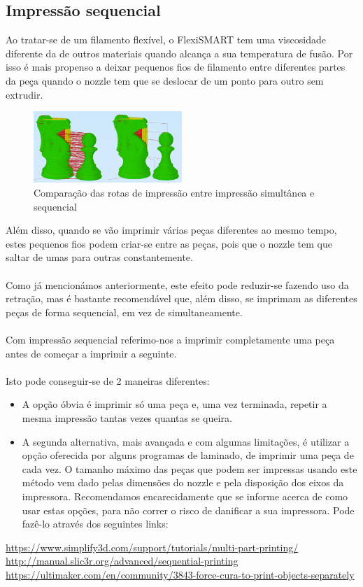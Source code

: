 \documentclass[11pt,a4paper]{article}
\begin{document}
	\subsection{Impressão sequencial}
Ao tratar-se de um filamento flexível, o FlexiSMART tem uma viscosidade diferente da de outros materiais quando alcança a sua temperatura de fusão. Por isso é mais propenso a deixar pequenos fios de filamento entre diferentes partes da peça quando o nozzle tem que se deslocar de um ponto para outro sem extrudir.
\begin{figure}[H]
\centering
\includegraphics[width=0.5\textwidth,cfbox=azul_marcos 4pt 0pt]{FOTOS/SEQUENTIALPRINTING}
\caption*{Comparação das rotas de impressão entre impressão simultânea e sequencial}
\end{figure}
Além disso, quando se vão imprimir várias peças diferentes ao mesmo tempo, estes pequenos fios podem criar-se entre as peças, pois que o nozzle tem que saltar de umas para outras constantemente.
\\\\
Como já mencionámos anteriormente, este efeito pode reduzir-se fazendo uso da retração, mas é bastante recomendável que, além disso, se imprimam as diferentes peças de forma sequencial, em vez de simultaneamente.
\\\\
Com impressão sequencial referimo-nos a imprimir completamente uma peça antes de começar a imprimir a seguinte.
\\\\
Isto pode conseguir-se de 2 maneiras diferentes:
\begin{itemize}
\item A opção óbvia é imprimir só uma peça e, uma vez terminada, repetir a mesma impressão tantas vezes quantas se queira.
\item A segunda alternativa, mais avançada e com algumas limitações, é utilizar a opção oferecida por alguns programas de laminado, de imprimir uma peça de cada vez. O tamanho máximo das peças que podem ser impressas usando este método vem dado pelas dimensões do nozzle e pela disposição dos eixos da impressora. Recomendamos encarecidamente que se informe acerca de como usar estas opções, para não correr o risco de danificar a sua impressora. Pode fazê-lo através dos seguintes links:
\end{itemize}
\url{https://www.simplify3d.com/support/tutorials/multi-part-printing/}\\
\url{http://manual.slic3r.org/advanced/sequential-printing}\\
\url{https://ultimaker.com/en/community/3843-force-cura-to-print-objects-separately}
\end{document}
